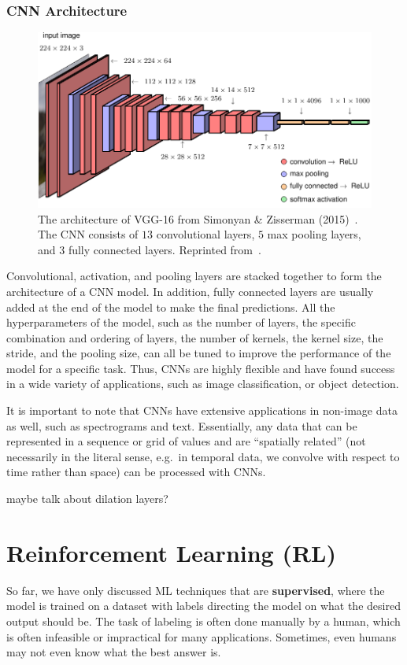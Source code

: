 \documentclass[12pt]{report}
\theoremstyle{definition}
\theoremstyle{remark}
\begin{document}
\subsection{CNN Architecture}
\begin{figure}[h]
    \centering
    \includegraphics[width=\linewidth]{figs/vgg-16.pdf}
    \caption{The architecture of VGG-16 from Simonyan \& Zisserman (2015)~\cite{simonyan_very_2015}. The CNN consists of $13$ convolutional layers, $5$ max pooling layers, and $3$ fully connected layers. Reprinted from~\cite{bishop_deep_2023}.}
\end{figure}
Convolutional, activation, and pooling layers are stacked together to form the architecture of a CNN model. In addition, fully connected layers are usually added at the end of the model to make the final predictions. All the hyperparameters of the model, such as the number of layers, the specific combination and ordering of layers, the number of kernels, the kernel size, the stride, and the pooling size, can all be tuned to improve the performance of the model for a specific task. Thus, CNNs are highly flexible and have found success in a wide variety of applications, such as image classification, or object detection.

It is important to note that CNNs have extensive applications in non-image data as well, such as spectrograms and text. Essentially, any data that can be represented in a sequence or grid of values and are ``spatially related'' (not necessarily in the literal sense, e.g.\ in temporal data, we convolve with respect to time rather than space) can be processed with CNNs.

maybe talk about dilation layers?

\chapter{Reinforcement Learning (RL)} %
So far, we have only discussed ML techniques that are \textbf{supervised}, where the model is trained on a dataset with labels directing the model on what the desired output should be. The task of labeling is often done manually by a human, which is often infeasible or impractical for many applications. Sometimes, even humans may not even know what the best answer is.
\end{document}
